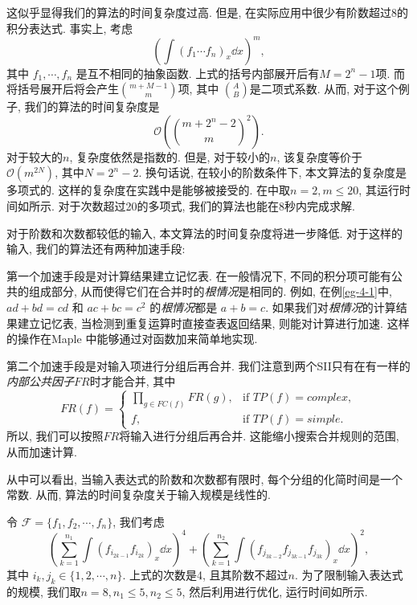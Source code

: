 这似乎显得我们的算法的时间复杂度过高. 但是, 在实际应用中很少有阶数超过8的积分表达式. 事实上, 考虑
\begin{equation}
\left(\int\!{(f_1\cdots f_n)_x\dd x}\right)^m,
\label{poly}
\end{equation}
其中 $f_1,\cdots,f_n$ 是互不相同的抽象函数. 上式的括号内部展开后有$M=2^n-1$项. 而将括号展开后将会产生$\binom{m+M-1}{m}$项, 其中 $\binom{A}{B}$是二项式系数. 从而, 对于这个例子, 我们的算法的时间复杂度是 
\begin{equation}
\mathcal O\left(\binom{m+2^n-2}{m}^2\right).
\label{polynomial_complexity}    
\end{equation}
对于较大的$n$, 复杂度依然是指数的. 但是, 对于较小的$n$, 该复杂度等价于
$\mathcal O(m^{2N})$, 其中$N=2^n-2$. 换句话说, 在较小的阶数条件下, 本文算法的复杂度是多项式的. 这样的复杂度在实践中是能够被接受的. 在中取$n=2,m\le 20$, 其运行时间如所示.
对于次数超过20的多项式, 我们的算法也能在8秒内完成求解. 

对于阶数和次数都较低的输入, 本文算法的时间复杂度将进一步降低. 对于这样的输入, 我们的算法还有两种加速手段: 
\begin{asparaenum}[(I)]
\item 第一个加速手段是对计算结果建立记忆表. 在一般情况下, 不同的积分项可能有公共的组成部分, 从而使得它们在合并时的\emph{根情况}是相同的. 例如, 在例\ref{eg-4-1}中, $ad+bd=cd$ 和 $ac+bc=c^2$ 的\emph{根情况}都是 $a+b=c$. 如果我们对\emph{根情况}的计算结果建立记忆表, 当检测到重复运算时直接查表返回结果, 则能对计算进行加速. 这样的操作在Maple 中能够通过对函数加来简单地实现\citep{maple_programming}.
\item 第二个加速手段是对输入项进行分组后再合并. 我们注意到两个SII只有在有一样的\emph{内部公共因子}$FR$时才能合并, 其中\begin{equation}    
FR(f)=\left\{
\begin{array}{cl}
\prod\limits_{g\in FC(f)}{FR(g)}, &\text{if }TP(f)=complex,\\ 
f,           &\text{if }TP(f)=simple.
\end{array}
\right.
\end{equation} 
所以, 我们可以按照$FR$将输入进行分组后再合并. 这能缩小搜索合并规则的范围, 从而加速计算. 
\end{asparaenum}

从中可以看出, 当输入表达式的阶数和次数都有限时, 每个分组的化简时间是一个常数. 从而, 算法的时间复杂度关于输入规模是线性的. 

令 $\mathcal F=\{f_1,f_2,\cdots,f_n\}$, 我们考虑
\begin{equation}
\left(\sum\limits_{k=1}^{n_1}{\int\!{(f_{i_{2k-1}}f_{i_{2k}})_x\dd x}}\right)^4+\left(\sum\limits_{k=1}^{n_2}{\int\!{(f_{j_{3k-2}}f_{j_{3k-1}}f_{j_{3k}})_x\dd x}}\right)^2,
\label{construct}
\end{equation}
其中 $i_k,j_k \in \{1,2,\cdots,n\}$. 上式的次数是4, 且其阶数不超过$n$. 为了限制输入表达式的规模, 我们取$n=8,n_1\le 5,n_2\le 5$, 然后利用进行优化, 运行时间如所示.  

